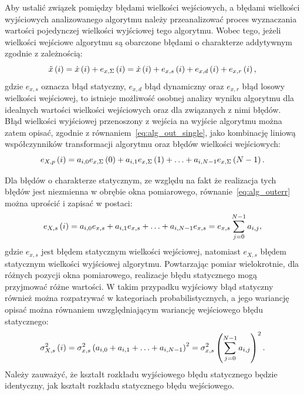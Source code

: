 Aby ustalić związek pomiędzy błędami wielkości wejściowych, a błędami wielkości wyjściowych analizowanego algorytmu należy przeanalizować proces wyznaczania wartości pojedynczej wielkości wyjściowej tego algorytmu. Wobec tego, jeżeli wielkości wejściowe algorytmu są obarczone błędami o charakterze addytywnym zgodnie z zależnością:
\begin{equation}
\tilde{x} \left(i\right) = \dot{x} \left(i\right) + e_{x,\Sigma} \left(i\right) = \dot{x} \left(i\right) + e_{x,s} \left(i\right) + e_{x,d} \left(i\right) + e_{x,r} \left(i\right) \label{eq:alg_inputval},
\end{equation}
gdzie $e_{x,s}$ oznacza błąd statyczny, $e_{x,d}$ błąd dynamiczny oraz $e_{x,r}$ błąd losowy wielkości wejściowej, to istnieje możliwość osobnej analizy wyniku algorytmu dla idealnych wartości wielkości wejściowych oraz dla związanych z nimi błędów. Błąd wielkości wyjściowej przenoszony z wejścia na wyjście algorytmu można zatem opisać, zgodnie z równaniem~\eqref{eq:alg_out_single}, jako kombinację liniową współczynników transformacji algorytmu oraz błędów wielkości wejściowych:
\begin{equation}
e_{X,p} \left(i\right) = a_{i, 0} e_{x,\Sigma} \left(0\right) + a_{i, 1} e_{x,\Sigma} \left(1\right) + \hdots + a_{i, N-1} e_{x,\Sigma} \left(N-1\right) \label{eq:alg_outerr}.
\end{equation}

Dla błędów o charakterze statycznym, ze względu na fakt że realizacja tych błędów jest niezmienna w obrębie okna pomiarowego, równanie~\eqref{eq:alg_outerr} można uprościć i zapisać w postaci:
\begin{equation}
e_{X,s} \left(i\right) = a_{i, 0} e_{x,s} + a_{i, 1} e_{x,s} + \hdots + a_{i, N-1} e_{x,s} = e_{x,s} \sum _{j = 0} ^{N-1} a_{i, j} \label{eq:alg_outerr_stat},
\end{equation}
gdzie $e_{x,s}$ jest błędem statycznym wielkości wejściowej, natomiast $e_{X,s}$ błędem statycznym wielkości wyjściowej algorytmu. Powtarzając pomiar wielokrotnie, dla różnych pozycji okna pomiarowego, realizacje błędu statycznego mogą przyjmować różne wartości. W takim przypadku wyjściowy błąd statyczny również można rozpatrywać w kategoriach probabilistycznych, a jego wariancję opisać można równaniem uwzględniającym wariancję wejściowego błędu statycznego:
\begin{equation}
\sigma_{X,s}^{2} \left(i\right) = \sigma_{x,s}^{2} \left( a_{i, 0} + a_{i, 1} + \hdots + a_{i, N-1} \right)^{2} = \sigma_{x,s}^{2} \left( \sum _{j = 0} ^{N-1} a_{i, j} \right)^{2} \label{eq:alg_outvar_stat}.
\end{equation}
Należy zauważyć, że kształt rozkładu wyjściowego błędu statycznego będzie identyczny, jak kształt rozkładu statycznego błędu wejściowego.

